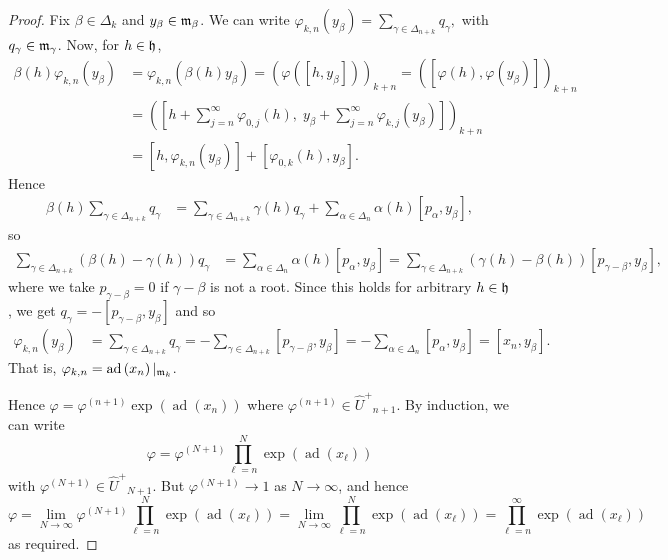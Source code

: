 \documentclass[11pt,letterpaper]{amsart}
\numberwithin{thecounter}{section}
\theoremstyle{definition}
\DeclareMathOperator{\ad}{ad}
\renewcommand{\a}{\alpha}
\renewcommand{\b}{\beta}
\newcommand{\g}{\gamma}
\newcommand{\Uhp}{{\widehat{U}^+}}
\begin{document}
\begin{longver}
\begin{proof}
Fix  $\b\in\Delta_k$ and $y_{\b}\in\frak m_\b$.
We can write
$ \varphi_{k,n}\left(y_{\b}\right)= \sum_{\g\in\Delta_{n+k}} q_\g,$
with $q_\g\in\frak m_\g$.
Now, for $h\in\frak h$,
\begin{align*}
\b\left(h\right) \varphi_{k,n}\left(y_{\b}\right) &=  \varphi_{k,n}\left(\b(h)y_{\b}\right)=\left(\varphi\left(\left[h,y_{\b}\right]\right)\right)_{k+n} = \left(\left[\varphi\left(h\right),\varphi\left(y_{\b}\right)\right]\right)_{k+n} \\
 &=\left(\left[ h + \sum_{j=n}^\infty \varphi_{0,j}\left(h\right),\; y_{\b}+ \sum_{j=n}^\infty \varphi_{k,j}\left(y_{\b}\right)\right]\right)_{k+n}\\
 &= \left[h, \varphi_{k,n}\left(y_{\b}\right)\right] + \left[ \varphi_{0,k}\left(h\right), y_{\b}\right].
\end{align*}
Hence
\begin{align*}
 \b\left(h\right) \sum_{\g\in\Delta_{n+k}}   q_{\g}
 &= \sum_{\g\in\Delta_{n+k}} \g\left(h\right) q_{\g}  + 
 \sum_{\a\in\Delta_n}  \a\left(h\right) \left[p_{\a},y_{\b}\right],
\end{align*}
so
\begin{align*}
  \sum_{\g\in\Delta_{n+k}}  \left(\b(h)-\g(h)\right) q_{\g}&=  \sum_{\a\in\Delta_n}  \a(h) \left[p_{\a},y_{\b}\right]
  = \sum_{\g\in\Delta_{n+k}}  \left(\g(h)-\b(h)\right)  \left[p_{\g-\b},y_{\b}\right],
\end{align*}
where we take $p_{\g-\b}=0$ if $\g-\b$ is not a root.
Since this holds for arbitrary $h\in\frak h$,  we get $q_{\g} = -\left[p_{\g-\b},y_{\b}\right]$ and so
\begin{align*}
 \varphi_{k,n}\left(y_{\b}\right) &= \sum_{\g\in\Delta_{n+k}}q_\g 
=- \sum_{\g\in\Delta_{n+k}}  \left[p_{\g-\b},y_{\b}\right] 
= - \sum_{\a\in\Delta_{n}} \left[p_{\a}, y_{\b}\right]=\left[x_n,y_{\b}\right].
\end{align*}
That is, $ \varphi_{k,n}=\ad\left(x_n\right)|_{{\frak m}_k}$.

Hence $\varphi = \varphi^{(n+1)}\exp\left(\ad\left(x_n\right)\right)$ where  $\varphi^{(n+1)}\in\Uhp_{n+1}$. 
By induction, we can write
$$\varphi =\varphi^{(N+1)} \prod_{\ell=n}^N \exp\left(\ad\left(x_\ell\right)\right) $$ 
with $\varphi^{(N+1)}\in \Uhp_{N+1}$.
But $\varphi^{(N+1)}\to1$ as $N\to\infty$, and hence
$$\varphi=\lim_{N\to\infty}  \varphi^{(N+1)}\prod_{\ell=n}^N \exp\left(\ad\left(x_\ell\right)\right) =\lim_{N\to\infty} \prod_{\ell=n}^N \exp\left(\ad\left(x_\ell\right)\right)
 = \prod_{\ell=n}^\infty \exp\left(\ad\left(x_\ell\right)\right)$$
as required.
\end{proof}
\end{longver}
\end{document}

